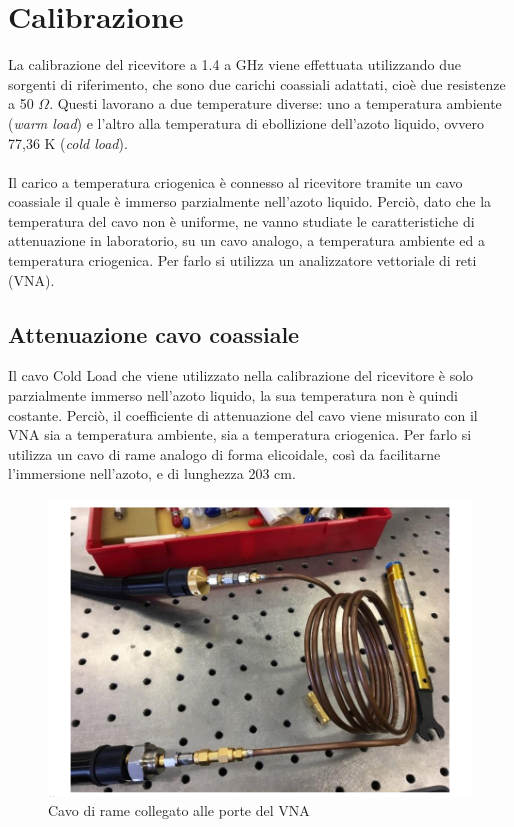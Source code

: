 \section{Calibrazione}
La calibrazione del ricevitore a 1.4 a GHz viene effettuata utilizzando due sorgenti di riferimento, che sono due carichi coassiali adattati, cioè due resistenze a 50 $\Omega$. Questi lavorano a due temperature diverse: uno a temperatura ambiente (\textit{warm load}) e l'altro alla temperatura di ebollizione dell'azoto liquido, ovvero 77,36 K (\textit{cold load}). \\\\Il carico a temperatura criogenica è connesso al ricevitore tramite un cavo coassiale il quale è immerso parzialmente nell'azoto liquido. Perciò, dato che la temperatura del cavo non è uniforme, ne vanno studiate le caratteristiche di attenuazione in laboratorio, su un cavo analogo, a temperatura ambiente ed a temperatura criogenica. Per farlo si utilizza un analizzatore vettoriale di reti (VNA).

\subsection{Attenuazione cavo coassiale}
Il cavo Cold Load che viene utilizzato nella calibrazione del ricevitore è solo parzialmente immerso nell'azoto liquido, la sua temperatura non è quindi costante. Perciò, il coefficiente di attenuazione del cavo viene misurato con il VNA sia a temperatura ambiente, sia a temperatura criogenica. Per farlo si utilizza un cavo di rame analogo di forma elicoidale, così da facilitarne l'immersione nell'azoto, e di lunghezza 203 cm. 

\begin{figure}[h]
\includegraphics[scale=0.60]{cavo rame.png}
\centering
\caption{Cavo di rame collegato alle porte del VNA}
\label{fig:Cavo di rame}
\end{figure}

